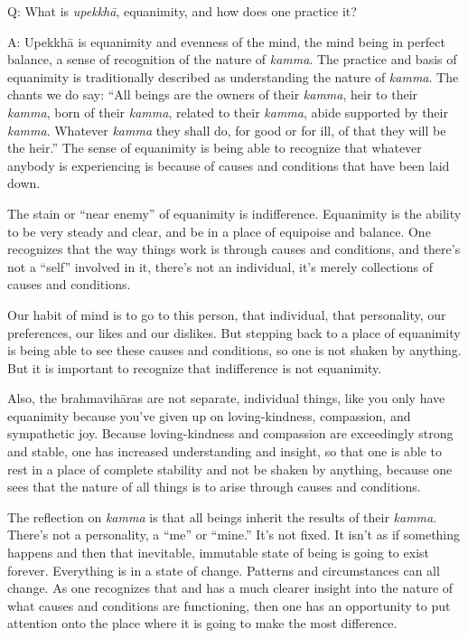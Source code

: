 \qaspace
Q: What is \emph{upekkhā}, equanimity, and how does one practice it?

\qaspace
A: Upekkhā is equanimity and evenness of the mind, the mind being in
perfect balance, a sense of recognition of the nature of \emph{kamma}.
The practice and basis of equanimity is traditionally described as
understanding the nature of \emph{kamma}. The chants we do say: “All
beings are the owners of their \emph{kamma}, heir to their \emph{kamma},
born of their \emph{kamma}, related to their \emph{kamma}, abide
supported by their \emph{kamma}. Whatever \emph{kamma} they shall do,
for good or for ill, of that they will be the heir.” The sense of
equanimity is being able to recognize that whatever anybody is
experiencing is because of causes and conditions that have been laid
down.

The stain or “near enemy” of equanimity is indifference. Equanimity is
the ability to be very steady and clear, and be in a place of equipoise
and balance. One recognizes that the way things work is through causes
and conditions, and there’s not a “self” involved in it, there’s not an
individual, it’s merely collections of causes and conditions.

Our habit of mind is to go to this person, that individual, that
personality, our preferences, our likes and our dislikes. But stepping
back to a place of equanimity is being able to see these causes and
conditions, so one is not shaken by anything. But it is important to
recognize that indifference is not equanimity.

Also, the brahmavihāras are not separate, individual things, like you
only have equanimity because you’ve given up on loving-kindness,
compassion, and sympathetic joy. Because loving-kindness and compassion
are exceedingly strong and stable, one has increased understanding and
insight, so that one is able to rest in a place of complete stability
and not be shaken by anything, because one sees that the nature of all
things is to arise through causes and conditions.

The reflection on \emph{kamma} is that all beings inherit the results of
their \emph{kamma}. There’s not a personality, a “me” or “mine.” It’s
not fixed. It isn’t as if something happens and then that inevitable,
immutable state of being is going to exist forever. Everything is in a
state of change. Patterns and circumstances can all change. As one
recognizes that and has a much clearer insight into the nature of what
causes and conditions are functioning, then one has an opportunity to
put attention onto the place where it is going to make the most
difference.

